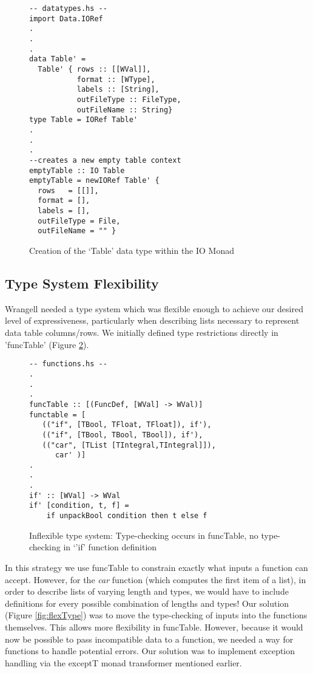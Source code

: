 \documentclass[preprint,nocopyrightspace]{sig-alternate}
\begin{document}
\begin{figure}
\caption{Creation of the `Table' data type within the IO Monad}
\begin{lstlisting}
-- datatypes.hs --
import Data.IORef
.
.
.
data Table' = 
  Table' { rows :: [[WVal]], 
           format :: [WType],
           labels :: [String],
           outFileType :: FileType, 
           outFileName :: String}
type Table = IORef Table'
.
.
.
--creates a new empty table context
emptyTable :: IO Table
emptyTable = newIORef Table' {
  rows   = [[]],
  format = [],
  labels = [],
  outFileType = File,
  outFileName = "" }
\end{lstlisting}
\label{tableIORef}
\end{figure}

\subsection{Type System Flexibility}
Wrangell needed a type system which was flexible enough to achieve our desired level of expressiveness, particularly when describing lists necessary to represent data table columns/rows. We initially defined type restrictions directly in 'funcTable' (Figure \ref{fig:inflexType}).
\begin{figure}
\caption{Inflexible type system: Type-checking occurs in funcTable, no type-checking in `'if' function definition}
\begin{lstlisting}
-- functions.hs --
.
.
.
funcTable :: [(FuncDef, [WVal] -> WVal)] 
functable = [
   (("if", [TBool, TFloat, TFloat]), if'),
   (("if", [TBool, TBool, TBool]), if'),
   (("car", [TList [TIntegral,TIntegral]]), 
      car' )]    
.
.
.          
if' :: [WVal] -> WVal
if' [condition, t, f] = 
    if unpackBool condition then t else f

\end{lstlisting}
\label{fig:inflexType}
\end{figure}
In this strategy we use funcTable to constrain exactly what inputs a function can accept. However, for the \emph{car} function (which computes the first item of a list), in order to describe lists of varying length and types, we would have to include definitions for every possible combination of lengths and types!
Our solution (Figure \ref{fig:flexType}) was to move the type-checking of inputs into the functions themselves. This allows more flexibility in funcTable. However, because it would now be possible to pass incompatible data to a function, we needed a way for functions to handle potential errors. Our solution was to implement exception handling via the exceptT monad transformer mentioned earlier.
\end{document}
